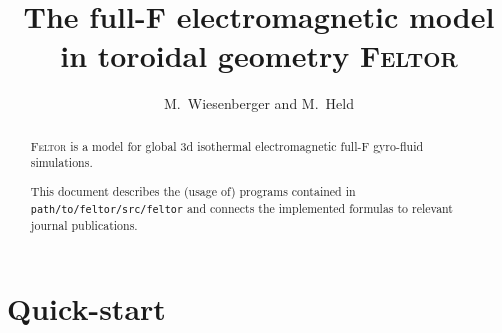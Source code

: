


\usepackage{minted}



\title{
The full-F electromagnetic model in toroidal geometry \textsc{Feltor}}
\author{ M.~Wiesenberger and M.~Held}
\maketitle

\begin{abstract}
\textsc{Feltor} is a model for global 3d isothermal electromagnetic full-F gyro-fluid simulations.

\noindent
This document describes the (usage of) programs
contained in \texttt{path/to/feltor/src/feltor}
and connects
the implemented formulas to relevant journal publications.
\end{abstract}
\tableofcontents

\section{Quick-start}
